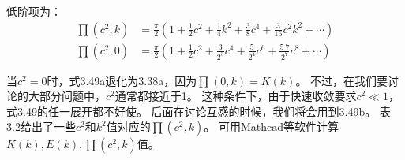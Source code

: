 低阶项为：
\begin{subequations}
	\begin{align}
\prod(c^2,k) &= \frac{\pi}{2}\left(1+\frac{1}{2}c^2+\frac{1}{4}k^2+\frac{3}{8}c^4+\frac{3}{16}c^2 k^2+\cdots \right) \\ 
\prod(c^2,0) &= \frac{\pi}{2}\left(1+\frac{1}{2}c^2+\frac{3}{2^3}c^4+\frac{5}{2^4}c^6+\frac{5\ 7}{2^7}c^8+\cdots \right) 
	\end{align}
\end{subequations}

当$c^2=0$时，式3.49a退化为3.38a，因为$\prod(0,k)=K(k)$。
不过，在我们要讨论的大部分问题中，$c^2$通常都接近于1。
这种条件下，由于快速收敛要求$c^2\ll 1$，式3.49的任一展开都不好使。
后面在讨论互感的时候，我们将会用到3.49b。
表3.2给出了一些$c^2$和$k^2$值对应的$\prod(c^2,k)$。
可用Mathcad等软件计算$K(k),E(k),\prod(c^2,k)$值。


